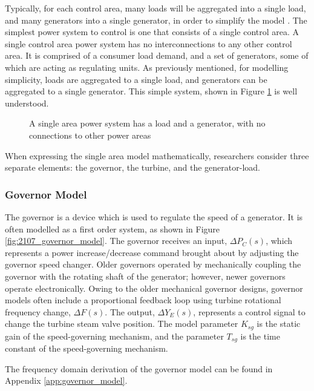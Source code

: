 Typically, for each control area, many loads will be aggregated into a single load, and many generators into a single generator, in order to simplify the model \cite{Grainger1994}. The simplest power system to control is one that consists of a single control area. A single control area power system has no interconnections to any other control area. It is comprised of a consumer load demand, and a set of generators, some of which are acting as regulating units. As previously mentioned, for modelling simplicity, loads are aggregated to a single load, and generators can be aggregated to a single generator. This simple system, shown in Figure \ref{fig:2106_single_area_system_overview} is well understood.

\begin{figure}[h]
	\centering
	\resizebox{4.5cm}{!}{}
	\caption[Single area power system]{A single area power system has a load and a generator, with no connections to other power areas}
	\label{fig:2106_single_area_system_overview}
\end{figure}

When expressing the single area model mathematically, researchers consider three separate elements: the governor, the turbine, and the generator-load.

\subsubsection{Governor Model} \label{sec:governor_model}
The governor is a device which is used to regulate the speed of a generator. It is often modelled as a first order system, as shown in Figure \ref{fig:2107_governor_model}. The governor receives an input, $\Delta P_C(s)$, which represents a power increase/decrease command brought about by adjusting the governor speed changer. Older governors operated by mechanically coupling the governor with the rotating shaft of the generator; however, newer governors operate electronically. Owing to the older mechanical governor designs, governor models often include a proportional feedback loop using turbine rotational frequency change, $\Delta F(s)$. The output, $\Delta Y_E(s)$, represents a control signal to change the turbine steam valve position. The model parameter $K_{sg}$ is the static gain of the speed-governing mechanism, and the parameter $T_{sg}$ is the time constant of the speed-governing mechanism.

The frequency domain derivation of the governor model can be found in Appendix \ref{app:governor_model}.

